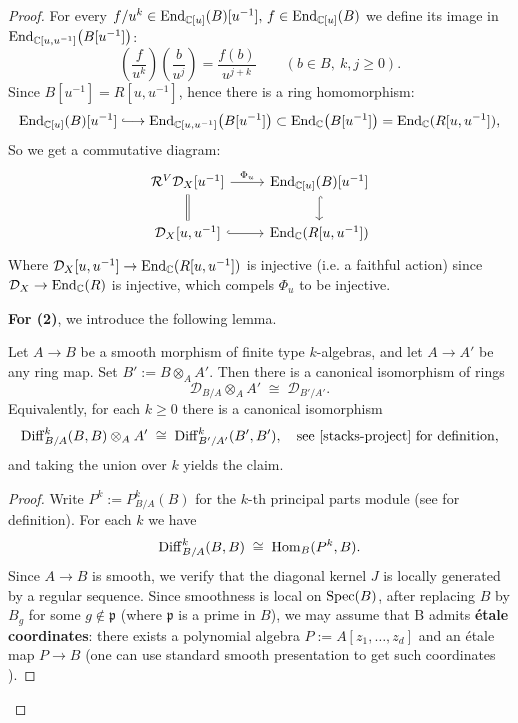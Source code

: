 \begin{proof}
    For every $f/u^k\in\operatorname{End}_{\mathbb{C}[u]}(B)[u^{-1}],\,f\in\operatorname{End}_{\mathbb{C}[u]}(B)$ we define its image in $\operatorname{End}_{\mathbb{C}[u,u^{-1}]}\bigl(B[u^{-1}]\bigr)$:
    \[
        \left(\frac{f}{u^k}\right)\!
        \left(\frac{b}{u^j}\right)=\frac{f(b)}{u^{j+k}}\qquad(b\in B,\ k,j\ge 0).
    \]
    Since $B[u^{-1}] = R[u,u^{-1}]$, hence there is a ring homomorphism:
    \[
        \End_{\C[u]}(B)[u^{-1}]\lhook\joinrel\longrightarrow \End_{\C[u,u^{-1}]}\bigl(B[u^{-1}]\bigr)
        \subset \End_{\C}\bigl(B[u^{-1}]\bigr) = \End_{\C}(R[u,u^{-1}]),
    \]
    So we get a commutative diagram:
    \[
        \begin{tikzcd}
            \mathcal{R}^V \mathcal{D}_X[u^{-1}] \arrow[r, "\Phi_u"] \arrow[d, equal] & \End_{\C[u]}(B)[u^{-1}] \arrow[d, hook] \\
            \mathcal{D}_X[u,u^{-1}] \arrow[r, hook] & \End_{\C}(R[u,u^{-1}])
        \end{tikzcd}
    \]
    Where $\mathcal{D}_X[u,u^{-1}] \to \operatorname{End}_{\mathbb{C}}(R[u,u^{-1}])$ is injective (i.e. a faithful action) since $\mathcal{D}_X \to \operatorname{End}_{\mathbb{C}}(R)$ is injective, which compels $\Phi_u$ to be injective.

    \medskip

    \noindent\textbf{For (2)}, we introduce the following lemma.

    \begin{lemma}\label{lem:base_change_of_D_modules}
        Let $A\to B$ be a smooth morphism of finite type $k$-algebras, and let $A\to A'$ be any ring map.
        Set $B' := B\otimes_A A'$. Then there is a canonical isomorphism of rings
        \[
            \mathcal{D}_{B/A}\otimes_A A' \;\cong\; \mathcal{D}_{B'/A'} .
        \]
        Equivalently, for each $k\ge 0$ there is a canonical isomorphism
        \[
            \Diff^k_{B/A}(B,B)\otimes_A A' \;\cong\; \Diff^k_{B'/A'}(B',B'),\quad \text{see \cite[\href{https://stacks.math.columbia.edu/tag/09CH}{Tag 09CH}]{stacks-project} for definition,}
        \]
        and taking the union over $k$ yields the claim.
    \end{lemma}

    \begin{proof}
        Write $P^k := P^k_{B/A}(B)$ for the $k$-th principal parts module (see \cite[\href{https://stacks.math.columbia.edu/tag/09CK}{Tag 09CK}]{stacks-project} for definition). For each $k$ we have
        \[
            \operatorname{Diff}^k_{B/A}(B,B)\;\cong\;\operatorname{Hom}_B(P^k,B).
        \]
        Since $A\to B$ is smooth, we verify that the diagonal kernel $J$ is locally generated by a regular sequence.
        Since smoothness is local on $\operatorname{Spec}(B)$, after replacing $B$ by $B_g$ for some $g\notin \mathfrak p$ (where $\mathfrak p$ is a prime in $B$),
        we may assume that B admits \textbf{étale coordinates}: there exists a polynomial algebra $P:=A[z_1,\dots,z_d]$ and an étale map $P\to B$ (one can use standard smooth presentation to get such coordinates \cite[\href{https://stacks.math.columbia.edu/tag/00TA}{Tag 00TA}]{stacks-project}).


\end{proof}
\end{proof}
